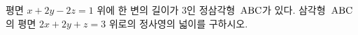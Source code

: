 평면 $x+2y-2z=1$ 위에 한 변의 길이가 $3$인 정삼각형~$\mathrm{ABC}$가 있다. 삼각형~$\mathrm{ABC}$의 평면 $2x+2y+z=3$ 위로의 정사영의 넓이를 구하시오.
